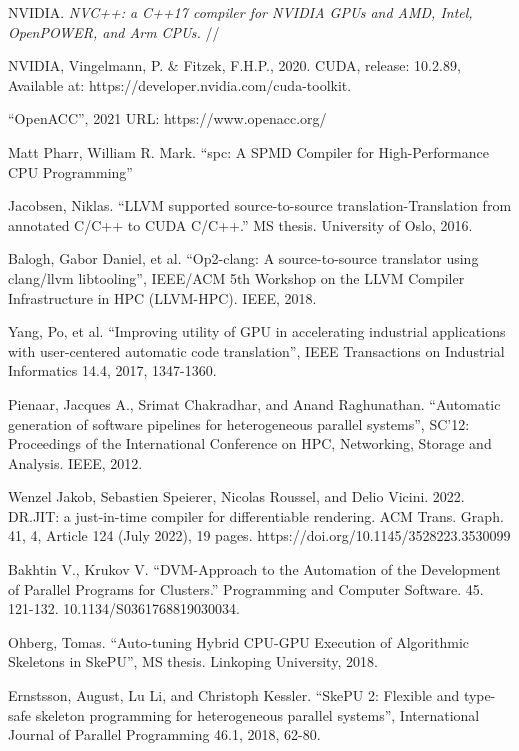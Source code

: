 \documentclass[11pt,fleqn,english,russian]{report} %
\begin{document}
\begin{thebibliography}{10}
	
	 NVIDIA. \textit{NVC++: a C++17 compiler for NVIDIA GPUs and AMD, Intel, OpenPOWER, and Arm CPUs.} // 	
	
	 NVIDIA, Vingelmann, P. \& Fitzek, F.H.P., 2020. CUDA, release: 10.2.89, Available at: https://developer.nvidia.com/cuda-toolkit.	
	
	 ``OpenACC'', 2021 URL: https://www.openacc.org/
	
	 Matt Pharr, William R. Mark. ``spc: A SPMD Compiler for High-Performance CPU Programming''
	
	 Jacobsen, Niklas. ``LLVM supported source-to-source translation-Translation from annotated C/C++ to CUDA C/C++.'' MS thesis. University of Oslo, 2016. 
	
	 Balogh, Gabor Daniel, et al. ``Op2-clang: A source-to-source translator using clang/llvm libtooling'', IEEE/ACM 5th Workshop on the LLVM Compiler Infrastructure in HPC (LLVM-HPC). IEEE, 2018. 
	
	 Yang, Po, et al. ``Improving utility of GPU in accelerating industrial applications with user-centered automatic code translation'', IEEE Transactions on Industrial Informatics 14.4, 2017, 1347-1360. 
	
	 Pienaar, Jacques A., Srimat Chakradhar, and Anand Raghunathan. ``Automatic generation of software pipelines for heterogeneous parallel systems'', SC'12: Proceedings of the International Conference on HPC, Networking, Storage and Analysis. IEEE, 2012. 	
	
	 Wenzel Jakob, Sebastien Speierer, Nicolas Roussel, and Delio Vicini. 2022. DR.JIT: a just-in-time compiler for differentiable rendering. ACM Trans. Graph. 41, 4, Article 124 (July 2022), 19 pages. https://doi.org/10.1145/3528223.3530099
	
	 Bakhtin V., Krukov V. ``DVM-Approach to the Automation of the Development of Parallel Programs for Clusters.'' Programming and Computer Software. 45. 121-132. 10.1134/S0361768819030034. 
	
	 Ohberg, Tomas. ``Auto-tuning Hybrid CPU-GPU Execution of Algorithmic Skeletons in SkePU'', MS thesis. Linkoping University, 2018.	
	
	 Ernstsson, August, Lu Li, and Christoph Kessler. ``SkePU 2: Flexible and type-safe skeleton programming for heterogeneous parallel systems'', International Journal of Parallel Programming 46.1, 2018, 62-80. 
	

\end{thebibliography}
\end{document}
